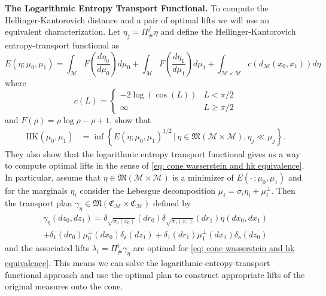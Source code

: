 \documentclass[11pt]{article}
\newcommand{\man}{\mathcal{M}}
\begin{document}
\noindent \textbf{The Logarithmic Entropy Transport Functional.}
To compute the Hellinger-Kantorovich distance and a pair of optimal lifts we will use an equivalent characterization. Let $\eta_j = \Pi^j_\#\eta$ and define the Hellinger-Kantorovich entropy-transport functional as
\begin{equation} \label{eq: let functional}
    E(\eta; \mu_0, \mu_1) = \int_{\man}F\left(\frac{d\eta_0}{d\mu_0}\right)d\mu_0 + \int_{\mathbb{\man}}F\left(\frac{d\eta_1}{d\mu_1}\right)d\mu_1 + \int_{\man \times \man}c(d_{\man}(x_0, x_1))d\eta
\end{equation}
where
\begin{equation*}
    c(L) = \begin{cases}
        -2\log(\cos(L)) & L < \pi/2 \\
        \infty & L \geq \pi/2
    \end{cases}
\end{equation*}
and $F(\rho) = \rho\log\rho - \rho + 1.$ \citet{liero2016optimal} show that 
\begin{align} \label{eq: let hk equivalence}
    \text{HK}(\mu_0, \mu_1) &= \inf\left\{E(\eta;\mu_0, \mu_1)^{1/2} \, |\, \eta  \in \mathfrak{M}(\man \times \man), \eta_j  \ll \mu_j\right\}.
\end{align}
They also show that the logarithmic entropy transport functional gives us a way to compute optimal lifts in the sense of \cref{eq: cone wasserstein and hk equivalence}. In particular, assume that $\eta \in \mathfrak{M}(\man \times \man)$ is a minimizer of $E(\cdot\,; \mu_0, \mu_1)$ and for the marginals $\eta_i$ consider the Lebesgue decomposition $\mu_i = \sigma_i\eta_i + \mu_i^\perp$. Then the transport plan $\gamma_{\eta} \in \mathfrak{M}(\mathfrak{C}_{\man} \times \mathfrak{C}_{\man})$ defined by
\begin{multline}\label{eq: optimal lift}
    \gamma_{\eta}(dz_0, dz_1) = \delta_{\sqrt{\sigma_0(x_0)}}(dr_0)\delta_{\sqrt{\sigma_1(x_1)}}(dr_1)\eta(dx_0, dx_1) \\
    + \delta_1(dr_0)\mu_0^\perp(dx_0)\delta_{\mathfrak{o}}(dz_1) + \delta_1(dr_1)\mu_1^\perp(dx_1)\delta_{\mathfrak{o}}(dz_0) 
\end{multline}
and the associated lifts $\lambda_i = \Pi_{\#}^i\gamma_\eta$ are optimal for \cref{eq: cone wasserstein and hk equivalence}. This means we can solve the logarithmic-entropy-transport functional approach and use the optimal plan to construct appropriate lifts of the original measures onto the cone. 
\end{document}
